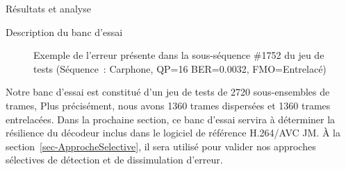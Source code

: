 \documentclass[letterpaper, twoside, 12pt,memoire]{thETS}
\newcommand{\ltCodec}{logiciel de référence H.264/AVC JM}
\begin{document}
\begin{chapter}{Résultats et analyse}
\begin{section}{Description du banc d'essai}
\begin{figure}[htb]
\caption{Exemple de l'erreur présente dans la sous-séquence
\#1752 du jeu de tests (Séquence~: Carphone, QP=16 BER=0.0032, FMO=Entrelacé)}
\label{fig-1752}
\end{figure}

Notre banc d'essai est constitué d'un jeu de tests de 2720 sous-ensembles de
trames, Plus précisément, nous avons 1360 trames dispersées et 1360 trames
entrelacées. Dans la prochaine section, ce banc d'essai servira à déterminer la
résilience du décodeur inclus dans le \ltCodec. À la
section~\ref{sec-ApprocheSelective}, il sera utilisé pour valider nos approches
sélectives de détection et de dissimulation d'erreur.

\end{section}


\end{chapter}
\end{document}
